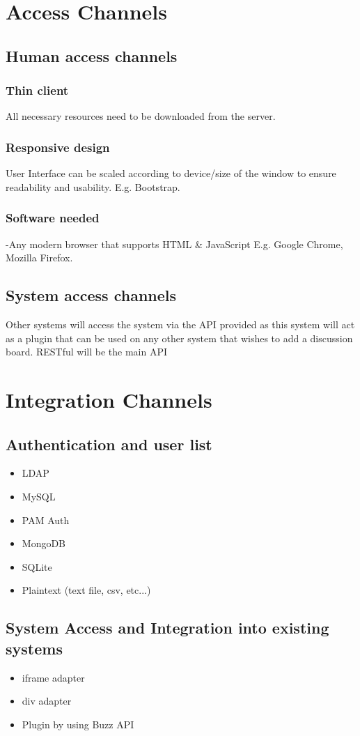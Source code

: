 
\section{Access Channels}
\subsection{Human access channels }
	\subsubsection{Thin client}
	All necessary resources need to be downloaded from the server.
	\subsubsection{Responsive design}
	User Interface can be scaled according to device/size of the window to ensure readability and usability. E.g. Bootstrap.

	\subsubsection{Software needed}
-Any modern browser that supports HTML \& JavaScript E.g. Google Chrome, Mozilla Firefox.


\subsection{System access channels }
Other systems will access the system via the API provided as this system will act as a plugin that can be used on any other system that wishes to add a discussion board.
RESTful will be the main API

\section{Integration Channels}
	\subsection{Authentication and user list}
	\begin{itemize}
		\item LDAP
		\item MySQL
		\item PAM Auth
		\item MongoDB
		\item SQLite
		\item Plaintext (text file, csv, etc...)
	\end{itemize}
	\subsection{System Access and Integration into existing systems}
	\begin{itemize}
		\item iframe adapter
		\item div adapter
		\item Plugin by using Buzz API
	\end{itemize}
